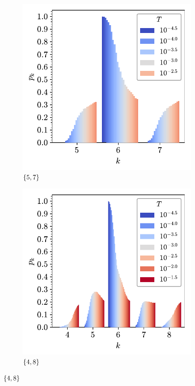 \begin{figure}[bt]
     \begin{subfigure}[b]{0.45\textwidth}
         \centering
         \includegraphics[width=\textwidth]{./figures/bilayers/triraft_57.pdf}
         \caption{$\left\{5,7\right\}$}
         \label{fig:trpk1}
     \end{subfigure}
     \hfill
	\begin{subfigure}[b]{0.45\textwidth}
         \centering
         \includegraphics[width=\textwidth]{./figures/bilayers/triraft_48.pdf}
         \caption{$\left\{4,8\right\}$}
         \label{fig:trpk2}
     \end{subfigure}
     \hfill
     

\end{figure}
